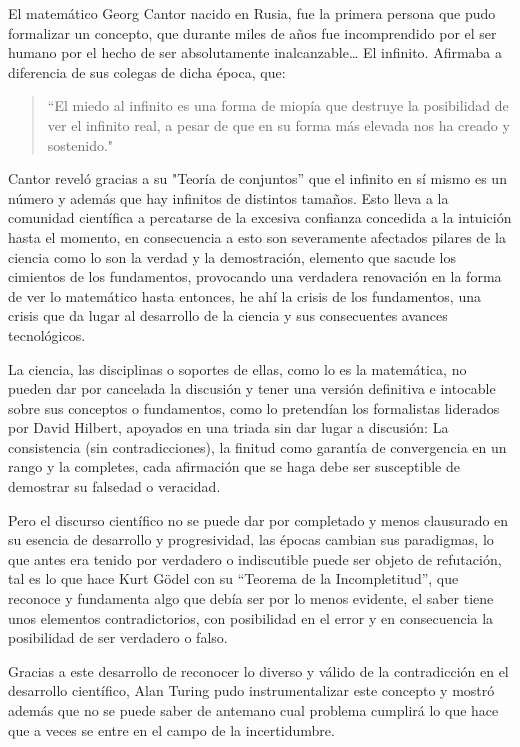 \documentclass{report}   %
\begin{document}
 El matemático Georg Cantor nacido en Rusia, fue la primera persona que pudo formalizar un concepto, que durante miles de años fue incomprendido por el ser humano por el hecho de ser absolutamente inalcanzable… El infinito. Afirmaba a diferencia de sus colegas de dicha época, que:
 
 \begin{quote}
      ``El miedo al infinito es una forma de miopía que destruye la posibilidad de ver el infinito real, a pesar de que en su forma más elevada nos ha creado y sostenido." 

 \end{quote}

 Cantor reveló  gracias a su "Teoría de conjuntos” que el infinito en sí mismo es un número y además que hay infinitos de distintos tamaños.
Esto lleva a la comunidad científica a percatarse de la excesiva confianza concedida a la intuición hasta el momento, en consecuencia a esto son severamente afectados pilares de la ciencia como lo son la verdad y la demostración, elemento que sacude los cimientos de los fundamentos, provocando una verdadera renovación en la forma de ver lo matemático hasta entonces, he ahí la crisis de los fundamentos, una crisis que da lugar al desarrollo de la  ciencia y sus consecuentes avances tecnológicos. 

La ciencia, las disciplinas o soportes de ellas, como lo es la matemática, no pueden dar por cancelada la discusión y tener una versión definitiva e intocable sobre sus conceptos o fundamentos, como lo pretendían los formalistas liderados por David Hilbert, apoyados en una triada sin dar lugar a discusión: La consistencia (sin contradicciones), la finitud como garantía de convergencia en un rango y la completes, cada afirmación que se haga debe ser susceptible de demostrar su falsedad o veracidad. 

Pero el discurso científico no se puede dar por completado y menos clausurado en su esencia de desarrollo y progresividad, las épocas cambian sus paradigmas, lo que antes era tenido por verdadero o indiscutible puede ser objeto de refutación, tal es lo que hace Kurt Gödel con su “Teorema de la Incompletitud”, que reconoce y fundamenta algo que debía ser  por lo menos evidente, el saber tiene unos elementos contradictorios, con posibilidad en el error y en consecuencia la posibilidad de ser verdadero o falso. 

Gracias a este desarrollo de reconocer lo diverso y válido de la contradicción en el desarrollo científico, Alan Turing pudo instrumentalizar este concepto y mostró además que no se puede saber de antemano cual problema cumplirá lo que hace que a veces se entre en el campo de la incertidumbre.
\end{document}
